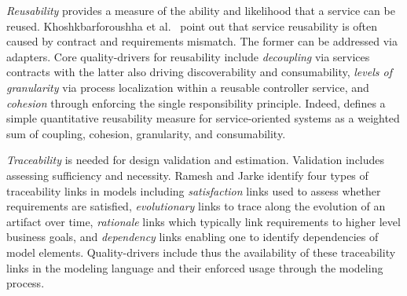 \emph{Reusability} provides a measure of the ability and likelihood that a service can be reused. Khoshkbarforoushha et al.\  \cite{khoshkbarforoushha_metric_2010,choi_quality_2008,feuerlicht_determinants_2007}
\cite{khoshkbarforoushha_metric_2010} point out that service reusability is often caused by contract and requirements mismatch. The former can be addressed via adapters. Core quality-drivers for reusability include \emph{decoupling} via services contracts with the latter also driving discoverability and consumability, \emph{levels of granularity} via process localization within a reusable controller service, and \emph{cohesion} through enforcing the single responsibility principle. Indeed, \cite{shim_design_2008} defines a simple quantitative reusability measure for service-oriented systems as a weighted sum of coupling, cohesion, granularity, and consumability.

\emph{Traceability} is needed for design validation and estimation. Validation includes assessing sufficiency and necessity. Ramesh and Jarke \cite{ramesh_toward_2001} identify four types of traceability links in models including \emph{satisfaction} links used to assess whether requirements are satisfied, \emph{evolutionary} links to trace along the evolution of an artifact over time, \emph{rationale} links which typically link requirements to higher level business goals, and \emph{dependency} links enabling one to identify dependencies of model elements. Quality-drivers include thus the availability of these traceability links in the modeling language and their enforced usage through the modeling process.
